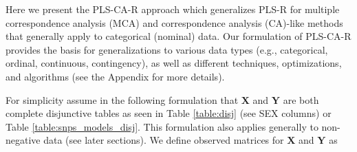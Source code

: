 \documentclass[12pt]{article}
\begin{document}
Here we present the PLS-CA-R approach which generalizes PLS-R for
multiple correspondence analysis (MCA) and correspondence analysis
(CA)-like methods that generally apply to categorical (nominal) data.
Our formulation of PLS-CA-R provides the basis for generalizations to
various data types (e.g., categorical, ordinal, continuous,
contingency), as well as different techniques, optimizations, and
algorithms (see the Appendix for more details).

For simplicity assume in the following formulation that \({\mathbf X}\)
and \({\mathbf Y}\) are both complete disjunctive tables as seen in
Table \ref{table:disj} (see SEX columns) or Table
\ref{table:snps_models_disj}. This formulation also applies generally to
non-negative data (see later sections). We define observed matrices for
\({\mathbf X}\) and \({\mathbf Y}\) as
\end{document}
